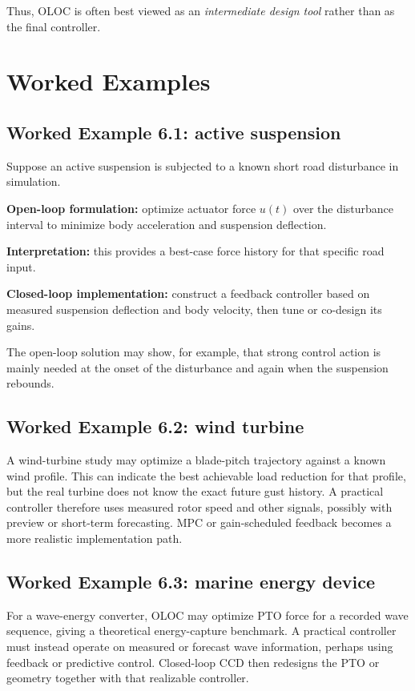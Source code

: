 \documentclass[11pt]{article}
\begin{document}
Thus, OLOC is often best viewed as an \emph{intermediate design tool} rather than as the final controller.

\section{Worked Examples}

\subsection{Worked Example 6.1: active suspension}

Suppose an active suspension is subjected to a known short road disturbance in simulation.

\textbf{Open-loop formulation:}
optimize actuator force $u(t)$ over the disturbance interval to minimize body acceleration and suspension deflection.

\textbf{Interpretation:}
this provides a best-case force history for that specific road input.

\textbf{Closed-loop implementation:}
construct a feedback controller based on measured suspension deflection and body velocity, then tune or co-design its gains.

The open-loop solution may show, for example, that strong control action is mainly needed at the onset of the disturbance and again when the suspension rebounds.

\subsection{Worked Example 6.2: wind turbine}

A wind-turbine study may optimize a blade-pitch trajectory against a known wind profile. This can indicate the best achievable load reduction for that profile, but the real turbine does not know the exact future gust history. A practical controller therefore uses measured rotor speed and other signals, possibly with preview or short-term forecasting. MPC or gain-scheduled feedback becomes a more realistic implementation path.

\subsection{Worked Example 6.3: marine energy device}

For a wave-energy converter, OLOC may optimize PTO force for a recorded wave sequence, giving a theoretical energy-capture benchmark. A practical controller must instead operate on measured or forecast wave information, perhaps using feedback or predictive control. Closed-loop CCD then redesigns the PTO or geometry together with that realizable controller.
\end{document}
